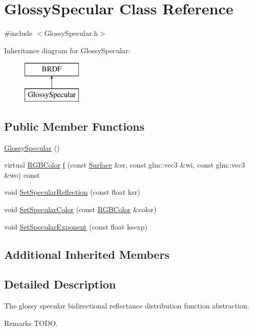 \hypertarget{class_glossy_specular}{}\section{Glossy\+Specular Class Reference}
\label{class_glossy_specular}


{\ttfamily \#include $<$Glossy\+Specular.\+h$>$}

Inheritance diagram for Glossy\+Specular\+:\begin{figure}[H]
\begin{center}
\leavevmode
\includegraphics[height=2.000000cm]{class_glossy_specular}
\end{center}
\end{figure}
\subsection*{Public Member Functions}
\begin{DoxyCompactItemize}
\item 
\hyperlink{class_glossy_specular_ae6e09109ef43e05bab37fc3086115787}{Glossy\+Specular} ()
\item 
virtual \hyperlink{class_r_g_b_color}{R\+G\+B\+Color} \hyperlink{class_glossy_specular_a91b042f409462732c96eab041c2cc7c6}{f} (const \hyperlink{class_surface}{Surface} \&sr, const glm\+::vec3 \&wi, const glm\+::vec3 \&wo) const
\item 
void \hyperlink{group___b_r_d_f_gab7e40f362680b631c40530c9c605e3b3}{Set\+Specular\+Reflection} (const float ksr)
\item 
void \hyperlink{group___b_r_d_f_ga4bc78448419beb3d49ae4a9d96a8c5ad}{Set\+Specular\+Color} (const \hyperlink{class_r_g_b_color}{R\+G\+B\+Color} \&color)
\item 
void \hyperlink{group___b_r_d_f_ga06b9d29c576be7fcacef68edb57cfc23}{Set\+Specular\+Exponent} (const float ksexp)
\end{DoxyCompactItemize}
\subsection*{Additional Inherited Members}


\subsection{Detailed Description}
The glossy specular bidirectional reflectance distribution function abstraction. \begin{DoxyRemark}{Remarks}
T\+O\+DO. 
\end{DoxyRemark}


